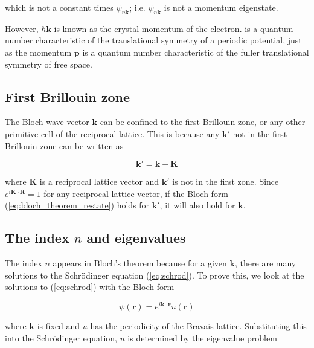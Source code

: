 		which is not a constant times $\psi_{n\mathbf{k}}$; i.e. $\psi_{n\mathbf{k}}$ is not a momentum eigenstate. 

		However, $\hbar \mathbf{k}$ is known as the crystal momentum  of the electron.  is a quantum number characteristic of the translational symmetry of a periodic potential, just as the momentum $\mathbf{p}$ is a quantum number characteristic of the fuller translational symmetry of free space. 

	\subsection{First Brillouin zone}
		The Bloch wave vector $\mathbf{k}$ can be confined to the first Brillouin zone, or any other primitive cell of the reciprocal lattice. This is because any $\mathbf{k'}$ not in the first Brillouin zone can be written as

			\begin{equation} \label{k_prime}
				\mathbf{k'=k+K}
			\end{equation}

		where $\mathbf{K}$ is a reciprocal lattice vector and $\mathbf{k'}$ is not in the first zone.  Since $e^{i\mathbf{K \cdot R}}=1$ for any reciprocal lattice vector, if the Bloch form (\ref{eq:bloch_theorem_restate}) holds for $\boldsymbol{k'}$, it will also hold for $\boldsymbol{k}$.

	\subsection{The index $n$ and eigenvalues}
		The index $n$ appears in Bloch's theorem because for a given $\mathbf{k}$, there are many solutions to the Schrödinger equation (\ref{eq:schrod}). To prove this, we look at the solutions to (\ref{eq:schrod}) with the Bloch form

		\begin{equation*}
			\psi(\mathbf{r})
			= e^{i\mathbf{k\cdot r}}
			u(\mathbf{r})
		\end{equation*}

		where $\mathbf{k}$ is fixed and $u$ has the periodicity of the Bravais lattice. Substituting this into the Schrödinger equation, $u$ is determined by the eigenvalue problem

